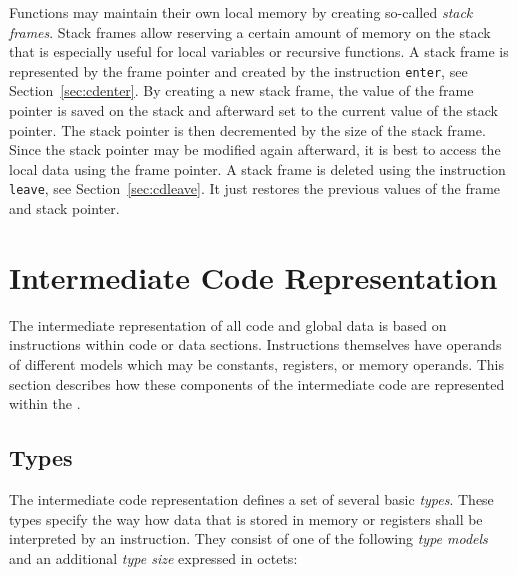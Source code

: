 Functions may maintain their own local memory by creating so-called \emph{stack frames}.
Stack frames allow reserving a certain amount of memory on the stack that is especially useful for local variables or recursive functions.
A stack frame is represented by the frame pointer and created by the instruction \texttt{enter}, see Section~\ref{sec:cdenter}.
By creating a new stack frame, the value of the frame pointer is saved on the stack and afterward set to the current value of the stack pointer.
The stack pointer is then decremented by the size of the stack frame.
Since the stack pointer may be modified again afterward, it is best to access the local data using the frame pointer.
A stack frame is deleted using the instruction \texttt{leave}, see Section~\ref{sec:cdleave}.
It just restores the previous values of the frame and stack pointer.

\section{Intermediate Code Representation}

The intermediate representation of all code and global data is based on instructions within code or data sections.
Instructions themselves have operands of different models which may be constants, registers, or memory operands.
This section describes how these components of the intermediate code are represented within the \ecs{}.

\subsection{Types}\label{sec:cdtypes}

The intermediate code representation defines a set of several basic \emph{types}.
These types specify the way how data that is stored in memory or registers shall be interpreted by an instruction.
They consist of one of the following \emph{type models} and an additional \emph{type size} expressed in octets:


